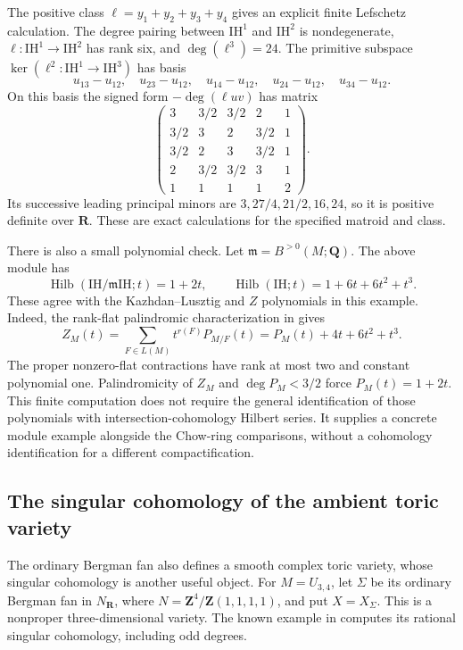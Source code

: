 The positive class $\ell=y_1+y_2+y_3+y_4$ gives an explicit finite
Lefschetz calculation. The degree pairing between
$\mathrm{IH}^1$ and $\mathrm{IH}^2$ is nondegenerate,
$\ell:\mathrm{IH}^1\to\mathrm{IH}^2$ has rank six, and
$\deg(\ell^3)=24$. The primitive subspace
$\ker(\ell^2:\mathrm{IH}^1\to\mathrm{IH}^3)$ has basis
\[
 u_{13}-u_{12},\quad u_{23}-u_{12},\quad u_{14}-u_{12},
 \quad u_{24}-u_{12},\quad u_{34}-u_{12}.
\]
On this basis the signed form $-\deg(\ell uv)$ has matrix
\[
 \begin{pmatrix}
 3&3/2&3/2&2&1\\
 3/2&3&2&3/2&1\\
 3/2&2&3&3/2&1\\
 2&3/2&3/2&3&1\\
 1&1&1&1&2
 \end{pmatrix}.
\]
Its successive leading principal minors are
$3,27/4,21/2,16,24$, so it is positive definite over $\mathbf R$.
These are exact calculations for the specified matroid and class.

There is also a small polynomial check. Let
$\mathfrak m=B^{>0}(M;\mathbf Q)$. The above module has
\[
 \operatorname{Hilb}(\mathrm{IH}/\mathfrak m\mathrm{IH};t)=1+2t,
 \qquad
 \operatorname{Hilb}(\mathrm{IH};t)=1+6t+6t^2+t^3.
\]
These agree with the Kazhdan--Lusztig and $Z$ polynomials in this
example. Indeed, the rank-flat palindromic characterization in
\cite[\S1.1]{BHM26SingularHodge} gives
\[
 Z_M(t)=\sum_{F\in L(M)}t^{r(F)}P_{M/F}(t)
       =P_M(t)+4t+6t^2+t^3.
\]
The proper nonzero-flat contractions have rank at most two and
constant polynomial one. Palindromicity of $Z_M$ and
$\deg P_M<3/2$ force $P_M(t)=1+2t$. This finite computation does
not require the general identification of those polynomials with
intersection-cohomology Hilbert series. It supplies a concrete
module example alongside the Chow-ring comparisons, without a
cohomology identification for a different compactification.

\subsection{The singular cohomology of the ambient toric variety}
\label{sec:appG-uniform-singular-cohomology}

The ordinary Bergman fan also defines a smooth complex toric variety,
whose singular cohomology is another useful object. For $M=U_{3,4}$,
let $\Sigma$ be its ordinary Bergman fan in
$N_{\mathbf R}$, where $N=\mathbf Z^4/\mathbf Z(1,1,1,1)$, and
put $X=X_\Sigma$. This is a nonproper three-dimensional variety.
The known example in \cite[Example~3.20]{Binder26UniformCohomology}
computes its rational singular cohomology, including odd degrees.

